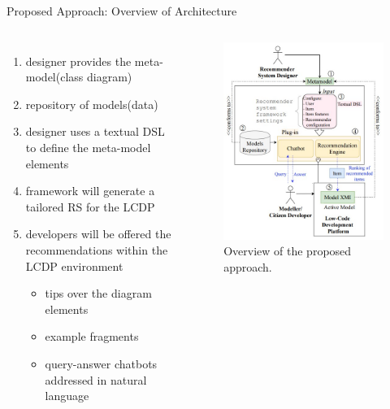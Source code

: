 \documentclass{beamer}
\begin{document}
\begin{frame}{Proposed Approach: Overview of Architecture}
    \begin{columns}
        \begin{enumerate}[1]
            \item designer provides the meta-model(class diagram)
            \item repository of models(data)
            \item designer uses a textual DSL to define the meta-model elements
            \item framework will generate a tailored RS for the LCDP
            \item developers will be offered the recommendations within the LCDP environment
            \begin{itemize}
                \item tips over the diagram elements
                \item example fragments
                \item query-answer chatbots addressed in natural language
            \end{itemize}
        \end{enumerate}
        \begin{figure}[p]
            \centering
            \includegraphics[width=\linewidth]{pic/overview.jpg}
            \caption{ Overview of the proposed approach.}
        \end{figure}
    \end{columns}
\end{frame}
\end{document}
